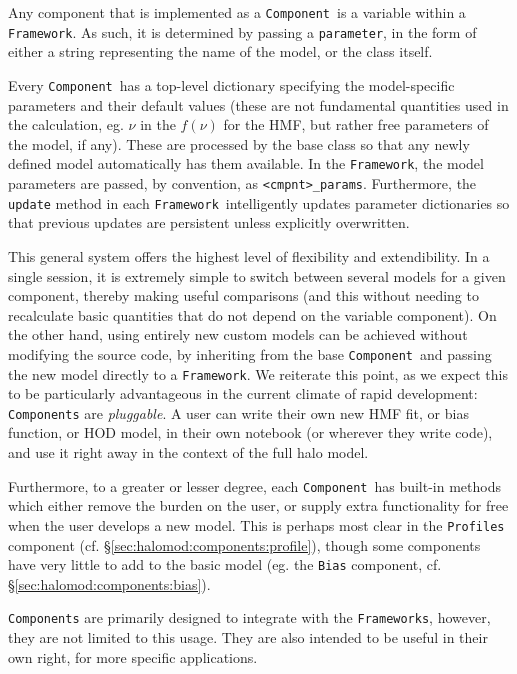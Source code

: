 \documentclass[5p,aas_macros]{elsarticle}
\newcommand{\framework}{\texttt{Framework}}
\newcommand{\component}{\texttt{Component}}
\newcommand{\parameter}{\texttt{parameter}}
\begin{document}
Any component that is implemented as a \component\ is a variable within a \framework. As such, it is determined by passing a \parameter, in the form of either a string representing the name of the model, or the class itself. 

Every \component\ has a top-level dictionary specifying the model-specific parameters and their default values (these are not fundamental quantities used in the calculation, eg. $\nu$ in the $f(\nu)$ for the HMF, but rather free parameters of the model, if any). These are processed by the base class so that any newly defined model automatically has them available. In the \framework, the model parameters are passed, by convention, as \verb|<cmpnt>_params|. Furthermore, the \verb|update| method in each \framework\ intelligently updates parameter dictionaries so that previous updates are persistent unless explicitly overwritten.

This general system offers the highest level of flexibility and extendibility. In a single session, it is extremely simple to switch between several models for a given component, thereby making useful comparisons (and this without needing to recalculate basic quantities that do not depend on the variable component). On the other hand, using entirely new custom models can be achieved without modifying the source code, by inheriting from the base \component\ and passing the new model directly to a \framework. We reiterate this point, as we expect this to be particularly advantageous in the current climate of rapid development: \texttt{Components} are \textit{pluggable}. A user can write their own new HMF fit, or bias function, or HOD model, in their own notebook (or wherever they write code), and use it right away in the context of the full halo model. 

Furthermore, to a greater or lesser degree, each \component\ has built-in methods which either remove the burden on the user, or supply extra functionality for free when the user develops a new model. This is perhaps most clear in the \verb|Profiles| component (cf. \S\ref{sec:halomod:components:profile}), though some components have very little to add to the basic model (eg. the \verb|Bias| component, cf. \S\ref{sec:halomod:components:bias}). 

\texttt{Components} are primarily designed to integrate with the \texttt{Frameworks}, however, they are not limited to this usage. They are also intended to be useful in their own right, for more specific applications. 
\end{document}
